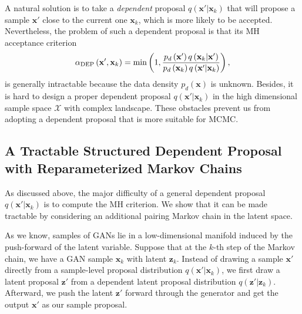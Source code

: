 \documentclass{article} %
\newcommand{\bx}{\mathbf{x}}
\newcommand{\bz}{\mathbf{z}}
\newcommand{\cX}{\mathcal{X}}
\newcommand{\<}{\left\langle}
\renewcommand{\>}{\right\rangle}
\begin{document}
A natural solution is to take a \textit{dependent} proposal $q(\bx'|\bx_k)$ that will propose a sample $\bx'$ close to the current one $\bx_k$, which is more likely to be accepted. 
Nevertheless, the problem of such a dependent proposal is that its MH acceptance criterion
\begin{equation}
    \alpha_{\rm DEP}\left(\mathbf{x}^{\prime}, \mathbf{x}_{k}\right)=\min \left(1, \frac{p_d\left(\mathbf{x}^{\prime}\right) q\left(\mathbf{x}_{k}|\bx'\right)}{p_d\left(\mathbf{x}_{k}\right) q\left(\mathbf{x}^{\prime}|\bx_k\right)}\right),
    \label{eq:dependent-proposal-acceptance}
\end{equation}
is generally intractable because the data density $p_d(\bx)$ is unknown. Besides, it is hard to design a proper dependent proposal $q(\bx'|\bx_k)$ in the high dimensional sample space $\cX$ with complex landscape. These obstacles prevent us from adopting a dependent proposal that is more suitable for MCMC.

\subsection{A Tractable Structured Dependent Proposal with Reparameterized Markov Chains}
As discussed above, the major difficulty of a general dependent proposal $q(\bx'|\bx_k)$ is to compute the MH criterion. We show that it can be made tractable by considering an additional pairing Markov chain in the latent space.

As we know, samples of GANs lie in a low-dimensional manifold induced by the push-forward of the latent variable. Suppose that at the $k$-th step of the Markov chain, we have a GAN sample $\bx_k$ with latent $\bz_k$. Instead of drawing a sample $\bx'$ directly from a sample-level proposal distribution $q(\bx'|\bx_k)$, we first draw a latent proposal $\bz'$ from a dependent latent proposal distribution $q(\bz'|\bz_k)$. Afterward, we push the latent $\bz'$ forward through the generator and get the output $\bx'$ as our sample proposal. 
\end{document}
